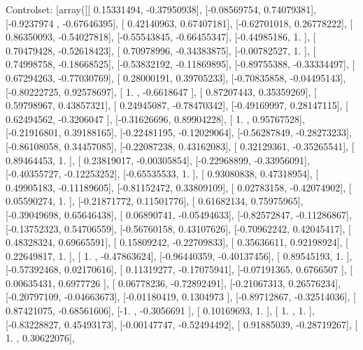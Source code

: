 \documentclass{article}
\begin{document}
Controlset: [array([[ 0.15331494, -0.37950938],
       [-0.08569754,  0.74079381],
       [-0.9237974 , -0.67646395],
       [ 0.42140963,  0.67407181],
       [-0.62701018,  0.26778222],
       [ 0.86350093, -0.54027818],
       [-0.55543845, -0.66455347],
       [-0.44985186,  1.        ],
       [ 0.70479428, -0.52618423],
       [ 0.70978996, -0.34383875],
       [-0.00782527,  1.        ],
       [ 0.74998758, -0.18668525],
       [-0.53832192, -0.11869895],
       [-0.89755388, -0.33334497],
       [ 0.67294263, -0.77030769],
       [ 0.28000191,  0.39705233],
       [-0.70835858, -0.04495143],
       [-0.80222725,  0.92578697],
       [ 1.        , -0.6618647 ],
       [ 0.87207443,  0.35359269],
       [ 0.59798967,  0.43857321],
       [ 0.24945087, -0.78470342],
       [-0.49169997,  0.28147115],
       [ 0.62494562, -0.3206047 ],
       [-0.31626696,  0.89904228],
       [ 1.        ,  0.95767528],
       [-0.21916801,  0.39188165],
       [-0.22481195, -0.12029064],
       [-0.56287849, -0.28273233],
       [-0.86108058,  0.34457085],
       [-0.22087238,  0.43162083],
       [ 0.32129361, -0.35265541],
       [ 0.89464453,  1.        ],
       [ 0.23819017, -0.00305854],
       [-0.22968899, -0.33956091],
       [-0.40355727, -0.12253252],
       [-0.65535533,  1.        ],
       [ 0.93080838,  0.47318954],
       [ 0.49905183, -0.11189605],
       [-0.81152472,  0.33809109],
       [ 0.02783158, -0.42074902],
       [ 0.05590274,  1.        ],
       [-0.21871772,  0.11501776],
       [ 0.61682134,  0.75975965],
       [-0.39049698,  0.65646438],
       [ 0.06890741, -0.05494633],
       [-0.82572847, -0.11286867],
       [-0.13752323,  0.54706559],
       [-0.56760158,  0.43107626],
       [-0.70962242,  0.42045417],
       [ 0.48328324,  0.69665591],
       [ 0.15809242, -0.22709833],
       [ 0.35636611,  0.92198924],
       [ 0.22649817,  1.        ],
       [ 1.        , -0.47863624],
       [-0.96440359, -0.40137456],
       [ 0.89545193,  1.        ],
       [-0.57392468,  0.02170616],
       [ 0.11319277, -0.17075941],
       [-0.07191365,  0.6766507 ],
       [ 0.00635431,  0.6977726 ],
       [ 0.06778236, -0.72892491],
       [-0.21067313,  0.26576234],
       [-0.20797109, -0.04663673],
       [-0.01180419,  0.1304973 ],
       [-0.89712867, -0.32514036],
       [ 0.87421075, -0.68561606],
       [-1.        , -0.3056691 ],
       [ 0.10169693,  1.        ],
       [ 1.        ,  1.        ],
       [-0.83228827,  0.45493173],
       [-0.00147747, -0.52494492],
       [ 0.91885039, -0.28719267],
       [ 1.        ,  0.30622076],
\end{document}
